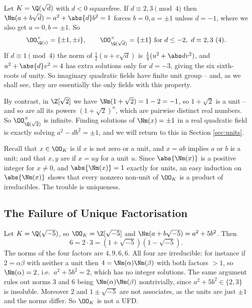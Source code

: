 \begin{example}\label{ex:unitsimag}
	Let $K = \Q(\sqrt d)$ with $d < 0$ squarefree. If $d \equiv 2,3 \pmod 4$ then $\Nm(a+b\sqrt d) = a^2 + \abs{d}b^2 = 1$ forces $b = 0, a = \pm1$ unless $d = -1$, where we also get $a = 0, b = \pm 1$. So
	$$\OO_{\Q(i)}^\times = \{\pm1,\pm i\}, \qquad \OO_{\Q(\sqrt d)}^\times = \{\pm 1\} \text{ for } d \leq -2,\ d\equiv 2,3 \ (4).$$
	If $d \equiv 1 \pmod 4$ the norm of $\tfrac12(u+v\sqrt d)$ is $\tfrac14(u^2 + \abs d v^2)$, and $u^2 + \abs{d}v^2 = 4$ has extra solutions only for $d = -3$, giving the six sixth-roots of unity. So imaginary quadratic fields have finite unit group -- and, as we shall see, they are essentially the only fields with this property.
\end{example}

\begin{example}
	By contrast, in $\Z[\sqrt2]$ we have $\Nm(1+\sqrt2) = 1 - 2 = -1$, so $1+\sqrt2$ is a unit -- and so are all its powers $(1+\sqrt2)^n$, which are pairwise distinct real numbers. So $\OO_{\Q(\sqrt2)}^\times$ is infinite. Finding solutions of $\Nm(x) = \pm 1$ in a real quadratic field is exactly solving  $a^2 - db^2 = \pm 1$, and we will return to this in Section \ref{sec:units}.
\end{example}

Recall that $x \in \OO_K$ is  if $x$ is not zero or a unit, and $x = ab$ implies $a$ or $b$ is a unit; and that $x, y$ are  if $x = uy$ for a unit $u$. Since $\abs{\Nm(x)}$ is a positive integer for $x \neq 0$, and $\abs{\Nm(x)} = 1$ exactly for units, an easy induction on $\abs{\Nm(x)}$ shows that every nonzero non-unit of $\OO_K$ is a product of irreducibles. The trouble is uniqueness.

\subsection{The Failure of Unique Factorisation}

\begin{example}\label{ex:fail}
	Let $K = \Q(\sqrt{-5})$, so $\OO_K = \Z[\sqrt{-5}]$ and $\Nm(a+b\sqrt{-5}) = a^2 + 5b^2$. Then
	$$6 = 2\cdot 3 = (1+\sqrt{-5})(1-\sqrt{-5}).$$
	The norms of the four factors are $4, 9, 6, 6$. All four are irreducible: for instance if $2 = \alpha\beta$ with neither a unit then $4 = \Nm(\alpha)\Nm(\beta)$ with both factors $> 1$, so $\Nm(\alpha) = 2$, i.e.\ $a^2+5b^2 = 2$, which has no integer solutions. The same argument rules out norms $3$ and $6$ being $\Nm(\alpha)\Nm(\beta)$ nontrivially, since $a^2+5b^2 \in \{2,3\}$ is insoluble. Moreover $2$ and $1\pm\sqrt{-5}$ are not associates, as the units are just $\pm 1$ and the norms differ. So $\OO_K$ is not a UFD.
\end{example}

